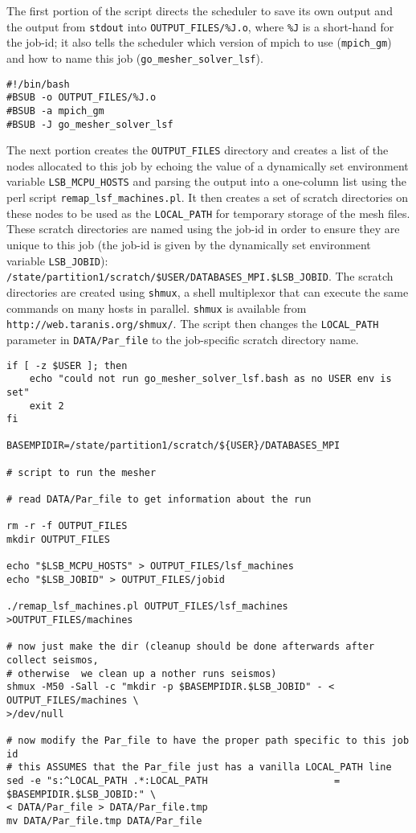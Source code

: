 \documentclass[onecolumn]{article}
\begin{document}
The first portion of the script directs the scheduler to save its own
output and the output from \texttt{stdout} into \texttt{OUTPUT\_FILES/\%J.o},
where \texttt{\%J} is a short-hand for the job-id; it also tells the scheduler
which version of mpich to use (\texttt{mpich\_gm}) and how to name this
job (\texttt{go\_mesher\_solver\_lsf}).

{\small
\begin{verbatim}
#!/bin/bash
#BSUB -o OUTPUT_FILES/%J.o
#BSUB -a mpich_gm
#BSUB -J go_mesher_solver_lsf
\end{verbatim}}

The next portion creates the \texttt{OUTPUT\_FILES} directory and creates
a list of the nodes allocated to this job by echoing the value of a
dynamically set environment variable \texttt{LSB\_MCPU\_HOSTS} and parsing the
output into a one-column list using the perl script \texttt{remap\_lsf\_machines.pl}.
It then creates a set of scratch directories on these nodes to be used as
the \texttt{LOCAL\_PATH} for temporary storage of the mesh files.
These scratch directories are named using the job-id in order to ensure
they are unique to this job (the job-id is given by the dynamically set
environment variable \texttt{LSB\_JOBID}): \\
\texttt{/state/partition1/scratch/\${USER}/DATABASES\_MPI.\$LSB\_JOBID}.
The scratch directories are created using \texttt{shmux}, a shell multiplexor
that can execute the same commands on many hosts in parallel.
\texttt{shmux} is available from \texttt{http://web.taranis.org/shmux/}.
The script then changes the \texttt{LOCAL\_PATH} parameter in
\texttt{DATA/Par\_file} to the job-specific scratch directory name.

{\small
\begin{verbatim}
if [ -z $USER ]; then
	echo "could not run go_mesher_solver_lsf.bash as no USER env is set"
	exit 2
fi

BASEMPIDIR=/state/partition1/scratch/${USER}/DATABASES_MPI

# script to run the mesher

# read DATA/Par_file to get information about the run

rm -r -f OUTPUT_FILES
mkdir OUTPUT_FILES

echo "$LSB_MCPU_HOSTS" > OUTPUT_FILES/lsf_machines
echo "$LSB_JOBID" > OUTPUT_FILES/jobid

./remap_lsf_machines.pl OUTPUT_FILES/lsf_machines >OUTPUT_FILES/machines

# now just make the dir (cleanup should be done afterwards after collect seismos,
# otherwise  we clean up a nother runs seismos)
shmux -M50 -Sall -c "mkdir -p $BASEMPIDIR.$LSB_JOBID" - < OUTPUT_FILES/machines \
>/dev/null

# now modify the Par_file to have the proper path specific to this job id
# this ASSUMES that the Par_file just has a vanilla LOCAL_PATH line
sed -e "s:^LOCAL_PATH .*:LOCAL_PATH                      =  $BASEMPIDIR.$LSB_JOBID:" \
< DATA/Par_file > DATA/Par_file.tmp
mv DATA/Par_file.tmp DATA/Par_file

\end{verbatim}}
\end{document}
